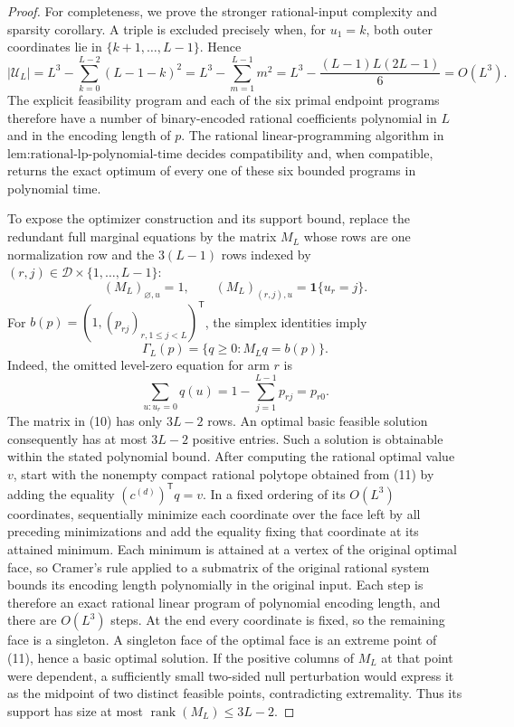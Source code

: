 \documentclass{article}
\begin{document}
\begin{proof}
For completeness, we prove the stronger rational-input complexity and sparsity corollary.  A triple is excluded precisely when, for \(u_1=k\), both outer coordinates lie in \(\{k+1,\ldots,L-1\}\).  Hence
\[
 |\mathcal U_L|
 =L^3-\sum_{k=0}^{L-2}(L-1-k)^2
 =L^3-\sum_{m=1}^{L-1}m^2
 =L^3-\frac{(L-1)L(2L-1)}6
 =O(L^3).
 \tag{9}
\]
The explicit feasibility program and each of the six primal endpoint programs therefore have a number of binary-encoded rational coefficients polynomial in \(L\) and in the encoding length of \(p\).  The rational linear-programming algorithm in \(\text{lem:rational-lp-polynomial-time}\) decides compatibility and, when compatible, returns the exact optimum of every one of these six bounded programs in polynomial time.

To expose the optimizer construction and its support bound, replace the redundant full marginal equations by the matrix \(M_L\) whose rows are one normalization row and the \(3(L-1)\) rows indexed by \((r,j)\in\mathcal D\times\{1,\ldots,L-1\}\):
\[
 (M_L)_{\varnothing,u}=1,
 \qquad
 (M_L)_{(r,j),u}=\mathbf 1\{u_r=j\}.
 \tag{10}
\]
For \(b(p)=(1,(p_{rj})_{r,1\le j<L})^{\mathsf T}\), the simplex identities imply
\[
 \Gamma_L(p)=\{q\ge0:M_Lq=b(p)\}.
 \tag{11}
\]
Indeed, the omitted level-zero equation for arm \(r\) is
\[
 \sum_{u:u_r=0}q(u)
 =1-\sum_{j=1}^{L-1}p_{rj}=p_{r0}.
\]
The matrix in (10) has only \(3L-2\) rows.  An optimal basic feasible solution consequently has at most \(3L-2\) positive entries.  Such a solution is obtainable within the stated polynomial bound.  After computing the rational optimal value \(v\), start with the nonempty compact rational polytope obtained from (11) by adding the equality \((c^{(d)})^{\mathsf T}q=v\).  In a fixed ordering of its \(O(L^3)\) coordinates, sequentially minimize each coordinate over the face left by all preceding minimizations and add the equality fixing that coordinate at its attained minimum.  Each minimum is attained at a vertex of the original optimal face, so Cramer's rule applied to a submatrix of the original rational system bounds its encoding length polynomially in the original input.  Each step is therefore an exact rational linear program of polynomial encoding length, and there are \(O(L^3)\) steps.  At the end every coordinate is fixed, so the remaining face is a singleton.  A singleton face of the optimal face is an extreme point of (11), hence a basic optimal solution.  If the positive columns of \(M_L\) at that point were dependent, a sufficiently small two-sided null perturbation would express it as the midpoint of two distinct feasible points, contradicting extremality.  Thus its support has size at most \(\operatorname{rank}(M_L)\le3L-2\).


\end{proof}
\end{document}
